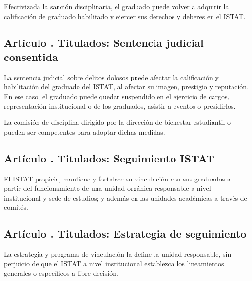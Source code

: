 Efectivizada la sanción disciplinaria, el graduado puede volver a adquirir la calificación de graduado habilitado y ejercer sus derechos y deberes en el ISTAT. 
\subsection{Artículo . Titulados: Sentencia judicial consentida}
\addtocounter{ns}{1}
La sentencia judicial sobre delitos dolosos puede afectar la calificación y habilitación del graduado del ISTAT, al afectar su imagen, prestigio y reputación. En ese caso, el graduado puede quedar suspendido en el ejercicio de cargos, representación institucional o de los graduados, asistir a eventos o presidirlos.  

La comisión de disciplina dirigido por la dirección de bienestar estudiantil o pueden ser competentes para adoptar dichas medidas.
\subsection{Artículo . Titulados: Seguimiento ISTAT}
\addtocounter{ns}{1}
El ISTAT propicia, mantiene y fortalece su vinculación con sus graduados a partir del funcionamiento de una unidad orgánica responsable a nivel institucional y sede de estudios; y además en las unidades académicas a través de comités. 
\subsection{Artículo . Titulados: Estrategia de seguimiento}
\addtocounter{ns}{1}
La estrategia y programa de vinculación la define la unidad responsable, sin perjuicio de que el ISTAT a nivel institucional establezca los lineamientos generales o específicos a libre decisión. 
